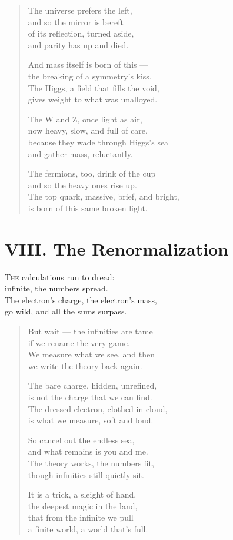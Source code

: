 \documentclass[11pt]{book}
\begin{document}
\begin{verse}
The universe prefers the left,\\
and so the mirror is bereft\\
of its reflection, turned aside,\\
and parity has up and died.

And mass itself is born of this ---\\
the breaking of a symmetry's kiss.\\
The Higgs, a field that fills the void,\\
gives weight to what was unalloyed.

The W and Z, once light as air,\\
now heavy, slow, and full of care,\\
because they wade through Higgs's sea\\
and gather mass, reluctantly.

The fermions, too, drink of the cup\\
and so the heavy ones rise up.\\
The top quark, massive, brief, and bright,\\
is born of this same broken light.
\end{verse}

\section*{VIII. The Renormalization}
\lettrine{T}{he} calculations run to dread:\\
infinite, the numbers spread.\\
The electron's charge, the electron's mass,\\
go wild, and all the sums surpass.

\begin{verse}
But wait --- the infinities are tame\\
if we rename the very game.\\
We measure what we see, and then\\
we write the theory back again.

The bare charge, hidden, unrefined,\\
is not the charge that we can find.\\
The dressed electron, clothed in cloud,\\
is what we measure, soft and loud.

So cancel out the endless sea,\\
and what remains is you and me.\\
The theory works, the numbers fit,\\
though infinities still quietly sit.

It is a trick, a sleight of hand,\\
the deepest magic in the land,\\
that from the infinite we pull\\
a finite world, a world that's full.
\end{verse}
\end{document}
